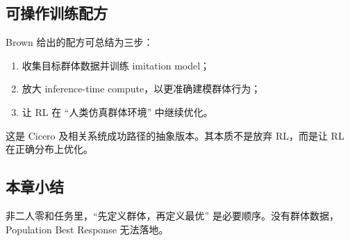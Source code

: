 \subsection{可操作训练配方}
Brown 给出的配方可总结为三步：
\begin{enumerate}
    \item 收集目标群体数据并训练 imitation model；
    \item 放大 inference-time compute，以更准确建模群体行为；
    \item 让 RL 在 ``人类仿真群体环境'' 中继续优化。
\end{enumerate}

这是 Cicero 及相关系统成功路径的抽象版本。其本质不是放弃 RL，而是让 RL 在正确分布上优化。

\subsection{本章小结}
非二人零和任务里，``先定义群体，再定义最优'' 是必要顺序。没有群体数据，Population Best Response 无法落地。

